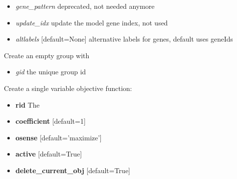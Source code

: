 \documentclass[a4paper,11pt,english]{sphinxmanual}
\begin{document}
\begin{fulllineitems}
\begin{fulllineitems}
\begin{itemize}
\item {} 
\emph{gene\_pattern} deprecated, not needed anymore

\item {} 
\emph{update\_idx} update the model gene index, not used

\item {} 
\emph{altlabels} {[}default=None{]} alternative labels for genes, default uses geneIds

\end{itemize}

\end{fulllineitems}


\begin{fulllineitems}
\label{modules_doc:cbmpy.CBModel.Model.createGroup}
Create an empty group with
\begin{itemize}
\item {} 
\emph{gid} the unique group id

\end{itemize}

\end{fulllineitems}


\begin{fulllineitems}
\label{modules_doc:cbmpy.CBModel.Model.createObjectiveFunction}
Create a single variable objective function:
\begin{itemize}
\item {} 
\textbf{rid} The

\item {} 
\textbf{coefficient} {[}default=1{]}

\item {} 
\textbf{osense} {[}default='maximize'{]}

\item {} 
\textbf{active} {[}default=True{]}

\item {} 
\textbf{delete\_current\_obj} {[}default=True{]}

\end{itemize}

\end{fulllineitems}


\end{fulllineitems}
\end{document}
